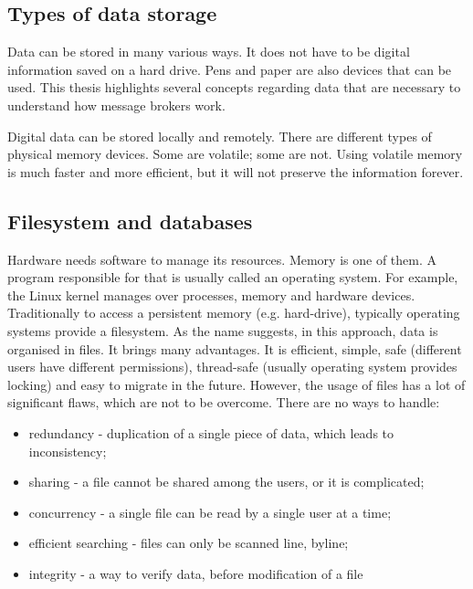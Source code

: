\subsection{Types of data storage}
\label{subsec:typesOfDataStorage}
Data can be stored in many various ways. It does not have to be digital information saved on a hard drive. Pens and paper are also devices that can be used. This thesis highlights several concepts regarding data that are necessary to understand how message brokers work.

Digital data can be stored locally and remotely. There are different types of physical memory devices. Some are volatile; some are not. Using volatile memory is much faster and more efficient, but it will not preserve the information forever. 

\subsection{Filesystem and databases}
\label{subsec:filesystemAndDatabases}

Hardware needs software to manage its resources. Memory is one of them. A program responsible for that is usually called an operating system. For example, the Linux kernel manages over processes, memory and hardware devices. Traditionally to access a persistent memory (e.g. hard-drive), typically operating systems provide a filesystem. As the name suggests, in this approach, data is organised in files. It brings many advantages. It is efficient, simple, safe (different users have different permissions), thread-safe (usually operating system provides locking) and easy to migrate in the future. However, the usage of files has a lot of significant flaws, which are not to be overcome. There are no ways to handle:
\begin{itemize}
\item redundancy - duplication of a single piece of data, which leads to inconsistency; 
\item sharing - a file cannot be shared among the users, or it is complicated;
\item concurrency - a single file can be read by a single user at a time;
\item efficient searching - files can only be scanned line, byline; 
\item integrity - a way to verify data, before modification of a file
\end{itemize}

